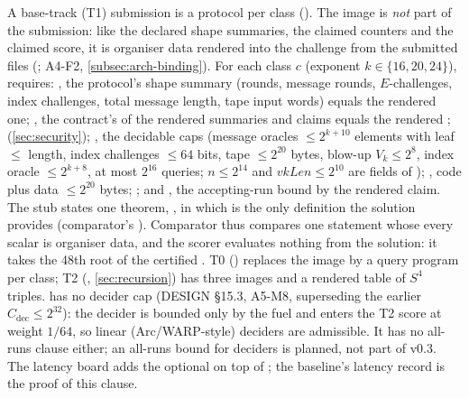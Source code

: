 A base-track (T1) submission is a protocol per class (). The image is \emph{not}
part of the submission: like the declared shape summaries, the claimed counters and the claimed
score, it is organiser data rendered into the challenge from the submitted files
(; A4-F2, \cref{subsec:arch-binding}). For each class $c$ (exponent
$k\in\{16,20,24\}$),  requires: , the protocol's shape summary
(rounds, message rounds, $E$-challenges, index challenges, total message length, tape input words)
equals the rendered one; , the contract's  of the rendered summaries and
claims equals the rendered ;  (\cref{sec:security}); , the
decidable caps (message oracles $\le2^{k+10}$ elements with leaf $\le$ length, index challenges
$\le64$ bits, tape $\le2^{20}$ bytes, blow-up $V_k\le 2^8$, index oracle $\le2^{k+8}$, at most
$2^{16}$ queries; $n\le2^{14}$ and $\mathit{vkLen}\le2^{10}$ are fields of );
, code plus data $\le2^{20}$ bytes; ; and , the accepting-run
bound by the rendered claim. The stub states one theorem, , in which
 is the only definition the solution provides (comparator's
). Comparator thus compares one statement whose every scalar is organiser
data, and the scorer evaluates nothing from the solution: it takes the 48th root of the certified
. T0 () replaces the image by a query program per class; T2
(, \cref{sec:recursion}) has three images and a rendered table of
$S^4$ triples.  has no decider cap (DESIGN §15.3, A5-M8, superseding the
earlier $C_{\mathrm{dec}}\le2^{32}$): the decider is bounded only by the fuel and enters the T2
score at weight $1/64$, so linear (Arc/WARP-style) deciders are admissible. It has no all-runs
clause either; an all-runs bound for deciders is planned, not part of v0.3. The latency board adds
the optional  on top of ; the baseline's latency record is the
proof of this clause.

